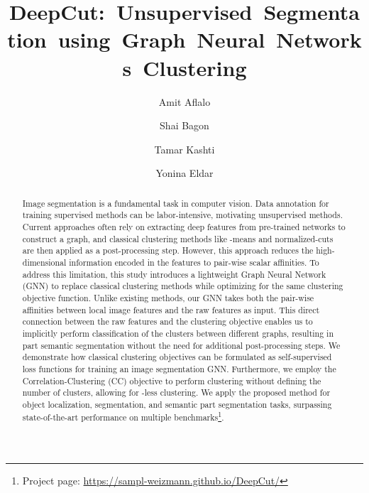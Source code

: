 \documentclass[10pt,twocolumn,letterpaper]{article}
\begin{document}
\title{\mbox{DeepCut: Unsupervised Segmentation using Graph Neural Networks Clustering}}

\author[ ]{Amit Aflalo}
\author[ ]{Shai Bagon}
\author[ ]{Tamar Kashti}
\author[ ]{Yonina Eldar}



\maketitle

\begin{abstract}
Image segmentation is a fundamental task in computer vision.
Data annotation for training supervised methods can be labor-intensive, motivating unsupervised methods.
Current approaches often rely on extracting deep features from pre-trained networks to construct a graph, and classical clustering methods like -means and normalized-cuts are then applied as a post-processing step. However, this approach reduces the high-dimensional information encoded in the features to pair-wise scalar affinities.
To address this limitation, this study introduces a lightweight Graph Neural Network (GNN) to replace classical clustering methods while optimizing for the same clustering objective function. Unlike existing methods, our GNN takes both the pair-wise affinities between local image features and the raw features as input. This direct connection between the raw features and the clustering objective enables us to implicitly perform classification of the clusters between different graphs, resulting in part semantic segmentation without the need for additional post-processing steps.
We demonstrate how classical clustering objectives can be formulated as self-supervised loss functions for training an image segmentation GNN. Furthermore, we employ the Correlation-Clustering (CC) objective to perform clustering without defining the number of clusters, allowing for -less clustering.
We apply the proposed method for object localization, segmentation, and semantic part segmentation tasks, surpassing state-of-the-art performance on multiple benchmarks\footnote{Project page: \href{https://sampl-weizmann.github.io/DeepCut/}{https://sampl-weizmann.github.io/DeepCut/}}.
\end{abstract}
\end{document}
